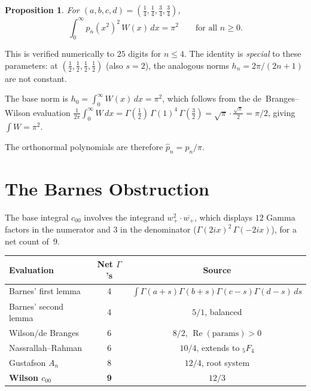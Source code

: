 \documentclass[11pt,a4paper]{article}
\newtheorem{proposition}{Proposition}[section]
\begin{document}
\begin{proposition}\label{prop:constnorm}
For $(a,b,c,d) = (\tfrac14,\tfrac14,\tfrac34,\tfrac34)$,
\[
  \int_0^\infty p_n(x^2)^2\, W(x)\, dx = \pi^2
  \qquad \text{for all } n \ge 0.
\]
\end{proposition}

This is verified numerically to $25$ digits for $n \le 4$.  The
identity is \emph{special} to these parameters: at
$(\tfrac12,\tfrac12,\tfrac12,\tfrac12)$ (also $s = 2$), the
analogous norms $h_n = 2\pi/(2n+1)$ are not constant.

The base norm is $h_0 = \int_0^\infty W(x)\,dx = \pi^2$, which
follows from the de~Branges--Wilson evaluation
$\frac{1}{2\pi} \int_0^\infty W\, dx
= \Gamma(\tfrac12)\,\Gamma(1)^4\,\Gamma(\tfrac32)
= \sqrt{\pi} \cdot \tfrac{\sqrt\pi}{2} = \pi/2$,
giving $\int W = \pi^2$.

The orthonormal polynomials are therefore $\hat p_n = p_n / \pi$.

\section{The Barnes Obstruction}

The base integral $c_{00}$ involves the integrand $w_+^2 \cdot
\overline{w_+}$, which displays $12$ Gamma factors in the numerator
and $3$ in the denominator ($\Gamma(2ix)^2\,\Gamma(-2ix)$), for a
net count of~$9$.

\begin{center}
\begin{tabular}{lcc}
\toprule
Evaluation & Net $\Gamma$'s & Source \\
\midrule
Barnes' first lemma  & 4 & $\int \Gamma(a{+}s)\Gamma(b{+}s)\Gamma(c{-}s)\Gamma(d{-}s)\,ds$ \\
Barnes' second lemma & 4 & $5/1$, balanced \\
Wilson/de Branges     & 6 & $8/2$, $\operatorname{Re}(\text{params}) > 0$ \\
Nassrallah--Rahman    & 6 & $10/4$, extends to ${}_5F_4$ \\
Gustafson $A_n$      & 8 & $12/4$, root system \\
\midrule
\textbf{Wilson $c_{00}$} & \textbf{9} & $12/3$ \\
\bottomrule
\end{tabular}
\end{center}
\end{document}
